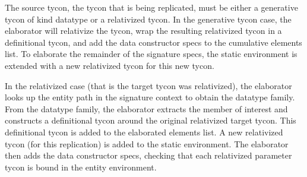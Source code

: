 The source tycon, the tycon that is being replicated, must be either a generative tycon of kind datatype or a relativized tycon. In the generative tycon case, the elaborator will relativize the tycon, wrap the resulting relativized tycon in a definitional tycon, and add the data constructor specs to the cumulative elements list. To elaborate the remainder of the signature specs, the static environment is extended with a new relativized tycon for this new tycon. %

In the relativized case (that is the target tycon was relativized), the elaborator looks up the entity path in the signature context to obtain the datatype family. From the datatype family, the elaborator extracts the member of interest and constructs a definitional tycon around the original relativized target tycon. This definitional tycon is added to the elaborated elements list. A new relativized tycon (for this replication) is added to the static environment. The elaborator then adds the data constructor specs, checking that each relativized parameter tycon is bound in the entity environment. 